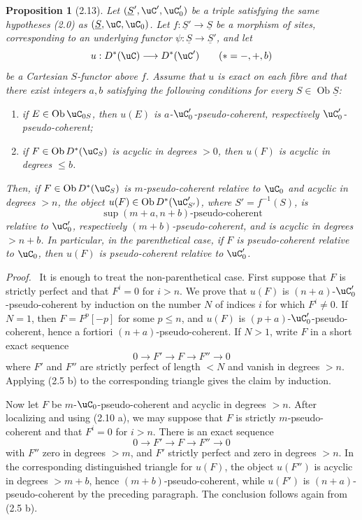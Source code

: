 \documentclass[11pt]{article}
\theoremstyle{plain}
\newtheorem*{proposition*}{Proposition}
\theoremstyle{definition}
\theoremstyle{remark}
\newenvironment{prooftext}{\par\noindent\textit{Proof.}\ }{\par\medskip}
\DeclareMathOperator{\ob}{Ob}
\providecommand{\uS}{\underline{S}}
\begin{document}
\begin{proposition*}[2.13]
Let $(\uS',\uC',\uC'_0)$ be a triple satisfying the same hypotheses (2.0) as $(\uS,\uC,\uC_0)$. Let $f:\uS'\to\uS$ be a morphism of sites, corresponding to an underlying functor $\psi:\uS\to\uS'$, and let
\[
u:D^*(\uC)\longrightarrow D^*(\uC')\qquad (*=-,+,b)
\]
be a Cartesian $S$-functor above $f$. Assume that $u$ is exact on each fibre and that there exist integers $a,b$ satisfying the following conditions for every $S\in\ob\uS$:
\begin{enumerate}[label=(\roman*)]
\item if $E\in\ob\uC_{0S}$, then $u(E)$ is $a$-$\uC'_0$-pseudo-coherent, respectively $\uC'_0$-pseudo-coherent;
\item if $F\in\ob D^*(\uC_S)$ is acyclic in degrees $>0$, then $u(F)$ is acyclic in degrees $\leq b$.
\end{enumerate}
Then, if $F\in\ob D^*(\uC_S)$ is $m$-pseudo-coherent relative to $\uC_0$ and acyclic in degrees $>n$, the object $u(F)\in\ob D^*(\uC'_{S'})$, where $S'=f^{-1}(S)$, is
\[
\sup(m+a,n+b)\text{-pseudo-coherent}
\]
relative to $\uC'_0$, respectively $(m+b)$-pseudo-coherent, and is acyclic in degrees $>n+b$. In particular, in the parenthetical case, if $F$ is pseudo-coherent relative to $\uC_0$, then $u(F)$ is pseudo-coherent relative to $\uC'_0$.
\end{proposition*}

\begin{prooftext}
It is enough to treat the non-parenthetical case. First suppose that $F$ is strictly perfect and that $F^i=0$ for $i>n$. We prove that $u(F)$ is $(n+a)$-$\uC'_0$-pseudo-coherent by induction on the number $N$ of indices $i$ for which $F^i\ne0$. If $N=1$, then $F=F^p[-p]$ for some $p\leq n$, and $u(F)$ is $(p+a)$-$\uC'_0$-pseudo-coherent, hence a fortiori $(n+a)$-pseudo-coherent. If $N>1$, write $F$ in a short exact sequence
\[
0\longrightarrow F'\longrightarrow F\longrightarrow F''\longrightarrow0
\]
where $F'$ and $F''$ are strictly perfect of length $<N$ and vanish in degrees $>n$. Applying (2.5 b) to the corresponding triangle gives the claim by induction.

Now let $F$ be $m$-$\uC_0$-pseudo-coherent and acyclic in degrees $>n$. After localizing and using (2.10 a), we may suppose that $F$ is strictly $m$-pseudo-coherent and that $F^i=0$ for $i>n$. There is an exact sequence
\[
0\longrightarrow F'\longrightarrow F\longrightarrow F''\longrightarrow0
\]
with $F''$ zero in degrees $>m$, and $F'$ strictly perfect and zero in degrees $>n$. In the corresponding distinguished triangle for $u(F)$, the object $u(F'')$ is acyclic in degrees $>m+b$, hence $(m+b)$-pseudo-coherent, while $u(F')$ is $(n+a)$-pseudo-coherent by the preceding paragraph. The conclusion follows again from (2.5 b).
\end{prooftext}
\end{document}
